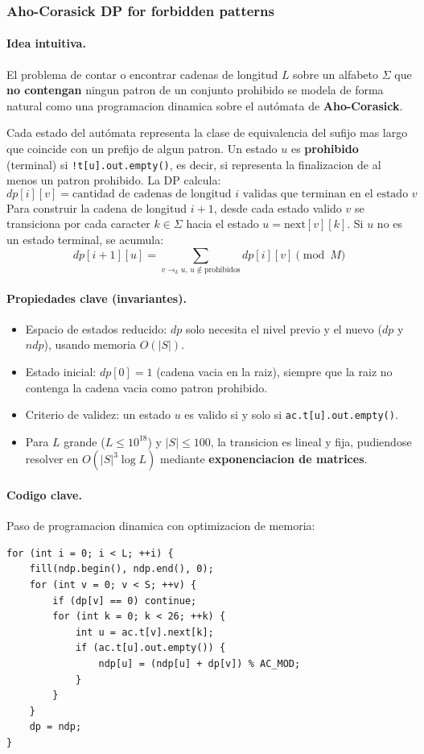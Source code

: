 \subsubsection{Aho-Corasick DP for forbidden patterns}

\paragraph{Idea intuitiva.}
El problema de contar o encontrar cadenas de longitud $L$ sobre un alfabeto $\Sigma$ que \textbf{no contengan} ningun patron de un conjunto prohibido se modela de forma natural como una programacion dinamica sobre el autómata de \textbf{Aho-Corasick}.

Cada estado del autómata representa la clase de equivalencia del sufijo mas largo que coincide con un prefijo de algun patron. Un estado $u$ es \textbf{prohibido} (terminal) si \verb|!t[u].out.empty()|, es decir, si representa la finalizacion de al menos un patron prohibido. La DP calcula:
\[
dp[i][v] = \text{cantidad de cadenas de longitud } i \text{ validas que terminan en el estado } v
\]
Para construir la cadena de longitud $i+1$, desde cada estado valido $v$ se transiciona por cada caracter $k \in \Sigma$ hacia el estado $u = \text{next}[v][k]$. Si $u$ no es un estado terminal, se acumula:
\[
dp[i+1][u] = \sum_{v \to_k u, \, u \notin \text{prohibidos}} dp[i][v] \pmod M
\]

\paragraph{Propiedades clave (invariantes).}
\begin{itemize}\setlength\itemsep{0pt}
	\item Espacio de estados reducido: $dp$ solo necesita el nivel previo y el nuevo ($dp$ y $ndp$), usando memoria $O(|S|)$.
	\item Estado inicial: $dp[0] = 1$ (cadena vacia en la raiz), siempre que la raiz no contenga la cadena vacia como patron prohibido.
	\item Criterio de validez: un estado $u$ es valido si y solo si \verb|ac.t[u].out.empty()|.
	\item Para $L$ grande ($L \le 10^{18}$) y $|S| \le 100$, la transicion es lineal y fija, pudiendose resolver en $O(|S|^3 \log L)$ mediante \textbf{exponenciacion de matrices}.
\end{itemize}

\paragraph{Codigo clave.}
Paso de programacion dinamica con optimizacion de memoria:
\begin{verbatim}
for (int i = 0; i < L; ++i) {
    fill(ndp.begin(), ndp.end(), 0);
    for (int v = 0; v < S; ++v) {
        if (dp[v] == 0) continue;
        for (int k = 0; k < 26; ++k) {
            int u = ac.t[v].next[k];
            if (ac.t[u].out.empty()) {
                ndp[u] = (ndp[u] + dp[v]) % AC_MOD;
            }
        }
    }
    dp = ndp;
}
\end{verbatim}

